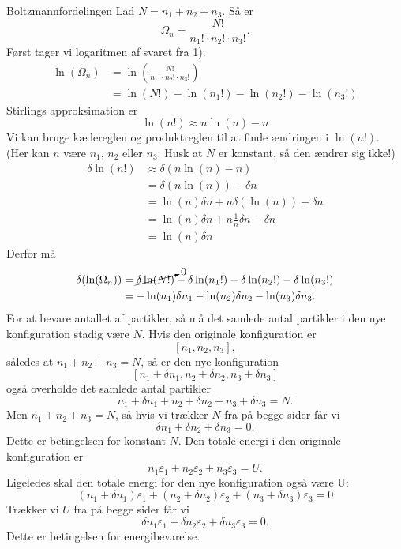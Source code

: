 \begin{opgave}{Boltzmannfordelingen}
    \opg Lad $N=n_1+n_2+n_3$. Så er
    \[ \Omega_n=\frac{N!}{n_1!\cdot n_2!\cdot n_3!}. \]
    \opg Først tager vi logaritmen af svaret fra 1).
    \begin{align*}
        \ln(\Omega_n)&=\ln\left(\frac{N!}{n_1!\cdot n_2!\cdot n_3!}\right)\\
        &=\ln(N!)-\ln(n_1!)-\ln(n_2!)-\ln(n_3!)
    \end{align*}
    Stirlings approksimation er 
    \[ \ln(n!)\approx n\ln(n)-n \]
    Vi kan bruge kædereglen og produktreglen til at finde ændringen i $\ln(n!)$. (Her kan $n$ være $n_1$, $n_2$ eller $n_3$. Husk at $N$ er konstant, så den ændrer sig ikke!)
    \begin{align*} 
        \delta \ln(n!)&\approx\delta(n\ln(n)-n)\\
        &=\delta(n\ln(n))-\delta n\\
        &=\ln(n)\delta n+n\delta(\ln(n))-\delta n\\
        &=\ln(n)\delta n+n\frac{1}{n}\delta n-\delta n\\
        &=\ln(n)\delta n
    \end{align*}
    Derfor må
    \begin{align*}
        \delta(\ln(\Omega_n))&=\cancelto{0}{\delta\ln(N!)}-\delta\ln(n_1!)-\delta\ln(n_2!)-\delta\ln(n_3!)\\
        &=-\ln(n_1)\delta n_1-\ln(n_2)\delta n_2-\ln(n_3)\delta n_3.
    \end{align*}
    \opg For at bevare antallet af partikler, så må det samlede antal partikler i den nye konfiguration stadig være $N$. Hvis den originale konfiguration er
    \[ [n_1,n_2,n_3], \]
    således at $n_1+n_2+n_3=N$, så er den nye konfiguration
    \[ [n_1+\delta n_1, n_2+\delta n_2, n_3+\delta n_3] \]
    også overholde det samlede antal partikler
    \[ n_1+\delta n_1 + n_2+\delta n_2+ n_3+\delta n_3=N. \]
    Men $n_1+n_2+n_3=N$, så hvis vi trækker $N$ fra på begge sider får vi
    \[ \delta n_1+\delta n_2+\delta n_3=0. \]
    Dette er betingelsen for konstant $N$. Den totale energi i den originale konfiguration er
    \[ n_1\varepsilon_1+n_2\varepsilon_2+n_3\varepsilon_3=U. \]
    Ligeledes skal den totale energi for den nye konfiguration også være U:
    \[ (n_1+\delta n_1)\varepsilon_1+(n_2+\delta n_2)\varepsilon_2+(n_3+\delta n_3)\varepsilon_3=0 \]
    Trækker vi $U$ fra på begge sider får vi
    \[ \delta n_1\varepsilon_1+\delta n_2\varepsilon_2+\delta n_3\varepsilon_3=0. \]
    Dette er betingelsen for energibevarelse.

\end{opgave}
